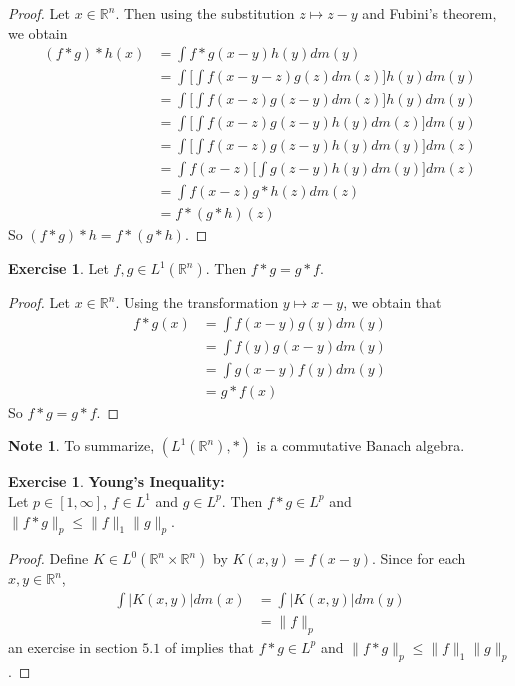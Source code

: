 \documentclass[12pt]{amsart}
\theoremstyle{definition}
\newtheorem{note}[definition]{Note}
\newtheorem{ex}[definition]{Exercise}
\newcommand{\R}{\mathbb{R}}
\newcommand{\lex}[1]{\label{ex:#1}}
\begin{document}
	\begin{proof}
	Let $x \in \R^n$. Then using the substitution $z \mapsto z-y$ and Fubini's theorem, we obtain
	\begin{align*}
	(f*g)*h(x) 
	&= \int f * g(x - y) h (y) dm(y) \\
	&= \int \bigg[ \int f(x-y-z) g(z) dm(z)  \bigg] h(y) dm(y) \\
	&= \int \bigg[ \int f(x-z) g(z - y) dm(z)  \bigg] h(y) dm(y) \\
	&= \int \bigg[ \int f(x-z) g(z - y)  h(y)dm(z)  \bigg]  dm(y) \\
	&= \int \bigg[ \int f(x-z) g(z - y)  h(y) dm(y)  \bigg] dm(z) \\
	&= \int f(x-z) \bigg[ \int g(z - y)  h(y) dm(y)  \bigg] dm(z) \\
	&= \int f(x-z) g*h(z) dm(z) \\
	&= f*(g*h)(z)
	\end{align*}
	So $(f*g)*h = f*(g*h)$. 
	\end{proof}
	
	\begin{ex}
	\lex{203}Let $f, g \in L^1(\R^n)$. Then $f * g = g* f$. 
	\end{ex}	
	
	\begin{proof}
	Let $x \in \R^n$. Using the transformation $y \mapsto x-y$, we obtain that 
	\begin{align*}
	f*g(x)
	&= \int f(x-y) g(y) dm(y) \\
	&= \int f(y) g(x-y) dm(y) \\
	&= \int g(x-y) f(y) dm(y) \\
	&= g *f(x)
	\end{align*}
	So $f * g = g* f$.
	\end{proof}
	
	\begin{note}
	To summarize, $(L^1(\R^n), *)$ is a commutative Banach algebra.
	\end{note}
	
	
	\begin{ex} \textbf{Young's Inequality:} \\
	\lex{204} Let $p \in [1,\infty]$, $f \in L^1$ and $g \in L^p$. Then $f*g \in L^p$ and $\|f *g\|_p \leq \|f\|_1\|g\|_p$. 
	\end{ex}
	
	\begin{proof}
	Define $K \in L^0(\R^n \times \R^n)$ by $K(x,y) = f(x-y)$. Since for each $x,y \in \R^n$, 
	\begin{align*}
	\int|K(x,y)|dm(x) 
	&= \int|K(x,y)|dm(y) \\
	&= \|f\|_p
	\end{align*} 
	an exercise in section $5.1$ of 
	\cite{measure}
	implies that $f*g \in L^p$ and $\|f *g\|_p \leq \|f\|_1\|g\|_p$.
	\end{proof}
	
\end{document}
